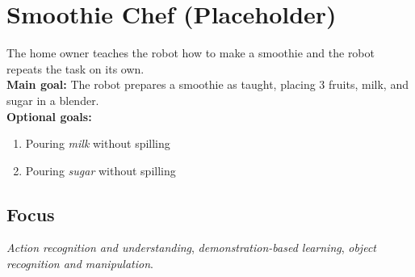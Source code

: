 \section{Smoothie Chef (Placeholder)}
\label{test:smoothie-chef}
The home owner teaches the robot how to make a smoothie and the robot repeats the task on its own.\\

\noindent \textbf{Main goal:} The robot prepares a smoothie as taught, placing 3 fruits, milk, and sugar in a blender.\\

\noindent \textbf{Optional goals:}
\begin{enumerate}[nosep]
	\item Pouring \emph{milk} without spilling
	\item Pouring \emph{sugar} without spilling
\end{enumerate}


\subsection*{Focus}
\emph{Action recognition and understanding}, \emph{demonstration-based learning}, \emph{object recognition and manipulation}.

